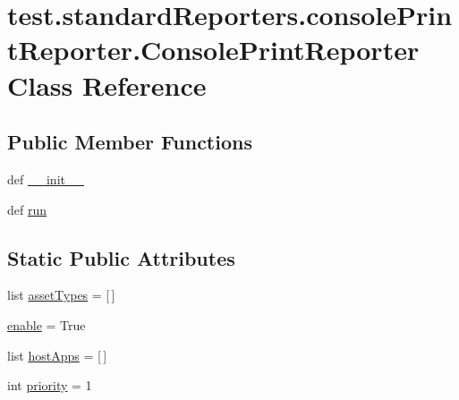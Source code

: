 \hypertarget{classtest_1_1standardReporters_1_1consolePrintReporter_1_1ConsolePrintReporter}{\section{test.\-standard\-Reporters.\-console\-Print\-Reporter.\-Console\-Print\-Reporter \-Class \-Reference}
\label{d0/d7f/classtest_1_1standardReporters_1_1consolePrintReporter_1_1ConsolePrintReporter}
}
\subsection*{\-Public \-Member \-Functions}
\begin{DoxyCompactItemize}
\item 
def \hyperlink{classtest_1_1standardReporters_1_1consolePrintReporter_1_1ConsolePrintReporter_a04c62abc2caf363a3cb26d7e65f9801e}{\-\_\-\-\_\-init\-\_\-\-\_\-}
\item 
def \hyperlink{classtest_1_1standardReporters_1_1consolePrintReporter_1_1ConsolePrintReporter_afc92ea71f79b972755b600d4cefb506b}{run}
\end{DoxyCompactItemize}
\subsection*{\-Static \-Public \-Attributes}
\begin{DoxyCompactItemize}
\item 
list \hyperlink{classtest_1_1standardReporters_1_1consolePrintReporter_1_1ConsolePrintReporter_a50974681fc293f1562c36a7c1f7030d2}{asset\-Types} = \mbox{[}$\,$\mbox{]}
\item 
\hyperlink{classtest_1_1standardReporters_1_1consolePrintReporter_1_1ConsolePrintReporter_aac5038958a446c30f517bfffb2d165ae}{enable} = \-True
\item 
list \hyperlink{classtest_1_1standardReporters_1_1consolePrintReporter_1_1ConsolePrintReporter_a6f3b7f99b3c5d800962be7e653c98ba2}{host\-Apps} = \mbox{[}$\,$\mbox{]}
\item 
int \hyperlink{classtest_1_1standardReporters_1_1consolePrintReporter_1_1ConsolePrintReporter_a587d6e98e29b1e9aad8147c46547e574}{priority} = 1
\end{DoxyCompactItemize}


